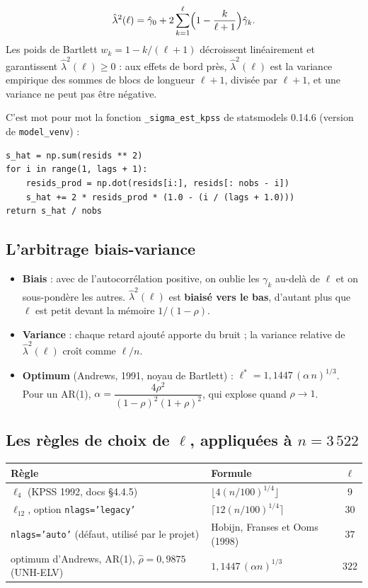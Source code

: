 \documentclass[11pt,a4paper]{article}
\newcommand{\code}[1]{\texttt{#1}}
\theoremstyle{definition}
\begin{document}
\[
\hat\lambda^2(\ell) = \hat\gamma_0 + 2\sum_{k=1}^{\ell}\Bigl(1 - \frac{k}{\ell+1}\Bigr)\hat\gamma_k .
\]
Les poids de Bartlett $w_k = 1 - k/(\ell+1)$ décroissent linéairement et garantissent $\hat\lambda^2(\ell) \ge 0$ : aux effets de bord près, $\hat\lambda^2(\ell)$ est la variance empirique des sommes de blocs de longueur $\ell+1$, divisée par $\ell+1$, et une variance ne peut pas être négative.

C'est mot pour mot la fonction \code{\_sigma\_est\_kpss} de statsmodels 0.14.6 (version de \code{model\_venv}) :
\begin{lstlisting}
s_hat = np.sum(resids ** 2)
for i in range(1, lags + 1):
    resids_prod = np.dot(resids[i:], resids[: nobs - i])
    s_hat += 2 * resids_prod * (1.0 - (i / (lags + 1.0)))
return s_hat / nobs
\end{lstlisting}

\subsection{L'arbitrage biais-variance}

\begin{itemize}
\item \textbf{Biais} : avec de l'autocorrélation positive, on oublie les $\gamma_k$ au-delà de $\ell$ et on sous-pondère les autres. $\hat\lambda^2(\ell)$ est \textbf{biaisé vers le bas}, d'autant plus que $\ell$ est petit devant la mémoire $1/(1-\rho)$.
\item \textbf{Variance} : chaque retard ajouté apporte du bruit ; la variance relative de $\hat\lambda^2(\ell)$ croît comme $\ell/n$.
\item \textbf{Optimum} (Andrews, 1991, noyau de Bartlett) : $\ell^* = 1{,}1447\,(\alpha\, n)^{1/3}$. Pour un AR(1), $\alpha = \dfrac{4\rho^2}{(1-\rho)^2(1+\rho)^2}$, qui explose quand $\rho \to 1$.
\end{itemize}

\subsection{Les règles de choix de \texorpdfstring{$\ell$}{l}, appliquées à \texorpdfstring{$n = 3\,522$}{n = 3522}}

\begin{center}
\begin{tabular}{@{}llc@{}}
\toprule
Règle & Formule & $\ell$ \\
\midrule
$\ell_4$ (KPSS 1992, docs \S4.4.5) & $\lfloor 4(n/100)^{1/4}\rfloor$ & $9$ \\
$\ell_{12}$, option \code{nlags='legacy'} & $\lceil 12(n/100)^{1/4}\rceil$ & $30$ \\
\code{nlags='auto'} (défaut, utilisé par le projet) & Hobijn, Franses et Ooms (1998) & $37$ \\
optimum d'Andrews, AR(1), $\hat\rho = 0{,}9875$ (UNH-ELV) & $1{,}1447\,(\alpha n)^{1/3}$ & $322$ \\
\bottomrule
\end{tabular}
\end{center}
\end{document}
